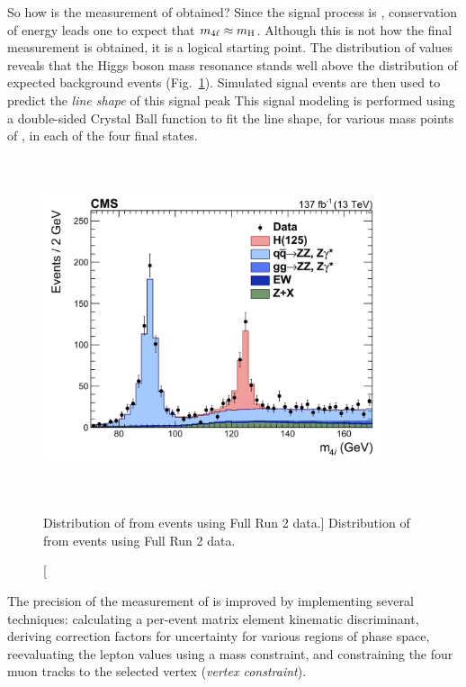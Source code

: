 So how is the measurement of \mH obtained?
Since the signal process is \hzzfourl, conservation of energy leads one to expect that $m_{4\ell} \approx m_{\mathrm{H}}$.
Although this is not how the final measurement is obtained, it is a logical starting point.
The distribution of \mfourl values reveals that the Higgs boson mass resonance stands well above the distribution of expected background events (Fig.~\ref{fig:m4l_run2}).
Simulated signal events are then used to predict the \emph{line shape} of this signal peak
This signal modeling is performed using a double-sided Crystal Ball function to fit the line shape, for various mass points of \mH, in each of the four final states.
\begin{figure}[pbth]
    \centering
    \includegraphics[width=10cm,height=10cm,keepaspectratio]{figures/higgsmassmeas/m4l_FullRun2_epjc.jpeg}
		\caption
			[Distribution of \mfourl from \hzzfourl events using Full Run 2 data.]
			{Distribution of \mfourl from \hzzfourl events using Full Run 2 data.}
        \label{fig:m4l_run2}
\end{figure}

The precision of the measurement of \mH is improved by implementing several techniques:
calculating a per-event matrix element kinematic discriminant,
deriving correction factors for \mfourl uncertainty for various regions of phase space,
reevaluating the lepton \pt values using a \Zone mass constraint,
and constraining the four muon tracks to the selected vertex (\emph{vertex constraint}).

